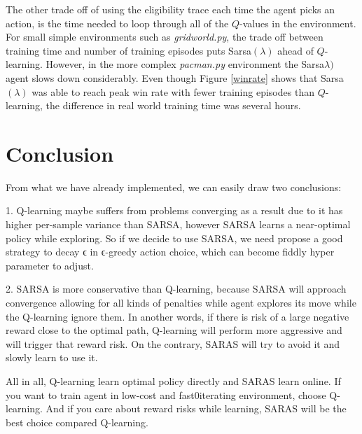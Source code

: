 \documentclass[10pt,conference]{IEEEtran}
\begin{document}
	The other trade off of using the eligibility trace each time the agent 
	picks an action, is the time needed to loop through all of the \(Q\)-values
	in the environment.  For small simple environments such as \textit{gridworld.py},
	the trade off between training time and number of training episodes puts 
	Sarsa\((\lambda)\) ahead of \(Q\)-learning.  However, in the more complex 
	\textit{pacman.py} environment the Sarsa\(\lambda)\) agent slows down 
	considerably.  Even though Figure \ref{winrate} shows that Sarsa\((\lambda)\) 
	was able to reach peak win rate with fewer training episodes than \(Q\)-learning,
	the difference in real world training time was several hours.

\section{Conclusion}
From what we have already implemented, we can easily draw two conclusions:

1. Q-learning maybe suffers from problems converging as a result due to it has higher per-sample variance than SARSA, however SARSA learns a near-optimal policy while exploring. So if we decide to use SARSA, we need propose a good strategy to decay ϵ in  ϵ-greedy action choice, which can become fiddly hyper parameter to adjust.

2. SARSA is more conservative than Q-learning, because SARSA will approach convergence allowing for all kinds of penalties while agent explores its move while the Q-learning ignore them. In another words, if there is risk of a large negative reward close to the optimal path, Q-learning will perform more aggressive and will trigger that reward risk. On the contrary, SARAS will try to avoid it and slowly learn to use it.

All in all, Q-learning learn optimal policy directly and SARAS learn online. If you want to train agent in low-cost and fast0iterating environment, choose Q-learning. And if you care about reward risks while learning, SARAS will be the best choice compared Q-learning.

\label{sec:conclusion}



\end{document}
